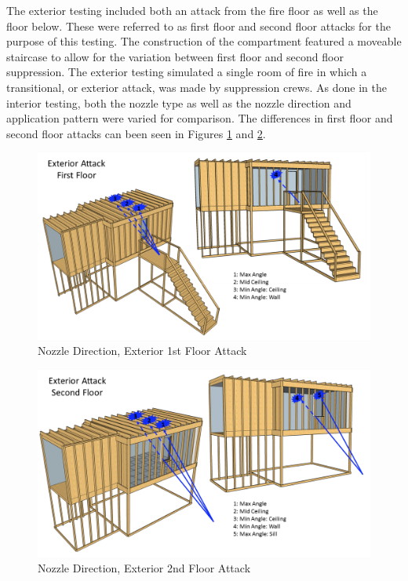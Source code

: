 \documentclass{article}
\begin{document}
\clearpage

The exterior testing included both an attack from the fire floor as well as the floor below. These were referred to as first floor and second floor attacks for the purpose of this testing. The construction of the compartment featured a moveable staircase to allow for the variation between first floor and second floor suppression. The exterior testing simulated a single room of fire in which a transitional, or exterior attack, was made by suppression crews. As done in the interior testing, both the nozzle type as well as the nozzle direction and application pattern were varied for comparison. The differences in first floor and second floor attacks can been seen in Figures \ref{fig:Nozzle_Direction_Exterior_1st_Floor_Attack} and \ref{fig:Nozzle_Direction_Exterior_2nd_Floor_Attack}.

\begin{figure}[!ht]
	\centering
	\includegraphics[width=6in]{Figures/Water_Distribution/Nozzle_Position_ExtFirstfloor}
	\caption{Nozzle Direction, Exterior 1st Floor Attack}
	\label{fig:Nozzle_Direction_Exterior_1st_Floor_Attack}
\end{figure}

\begin{figure}[!ht]
	\centering
	\includegraphics[width=6in]{Figures/Water_Distribution/Nozzle_Position_ExtSecondfloor}
	\caption{Nozzle Direction, Exterior 2nd Floor Attack}
	\label{fig:Nozzle_Direction_Exterior_2nd_Floor_Attack}
\end{figure}
\end{document}

